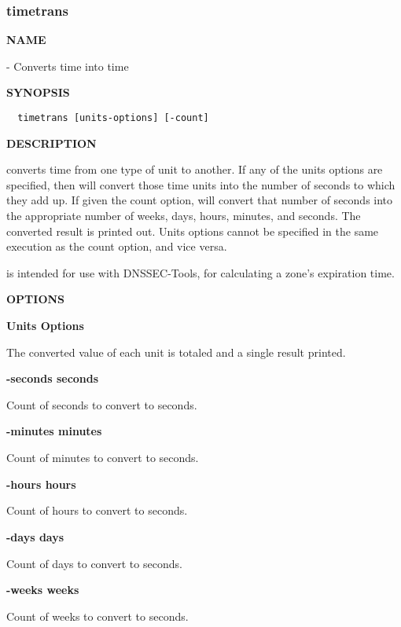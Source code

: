 \clearpage

\subsubsection{timetrans}

{\bf NAME}

 - Converts time into time

{\bf SYNOPSIS}

\begin{verbatim}
  timetrans [units-options] [-count]
\end{verbatim}

{\bf DESCRIPTION}

 converts time from one type of unit to another.  If any of the
units options are specified, then  will convert those time units
into the number of seconds to which they add up.  If given the count option,
 will convert that number of seconds into the appropriate number
of weeks, days, hours, minutes, and seconds.  The converted result is printed
out.  Units options cannot be specified in the same execution as the count
option, and vice versa.

 is intended for use with DNSSEC-Tools, for calculating
a zone's expiration time.

{\bf OPTIONS}

{\bf Units Options}

The converted value of each unit is totaled and a single result printed.

\begin{description}

\item {\bf -seconds seconds}\verb" "

Count of seconds to convert to seconds.

\item {\bf -minutes minutes}\verb" "

Count of minutes to convert to seconds.

\item {\bf -hours hours}\verb" "

Count of hours to convert to seconds.

\item {\bf -days days}\verb" "

Count of days to convert to seconds.

\item {\bf -weeks weeks}\verb" "

Count of weeks to convert to seconds.

\end{description}

